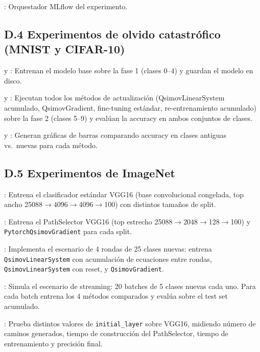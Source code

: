 : Orquestador MLflow del experimento.

\subsection{D.4 Experimentos de olvido catastrófico (MNIST y CIFAR-10)}

 y
: Entrenan el
modelo base sobre la fase 1 (clases 0--4) y guardan el modelo en disco.

 y
: Ejecutan todos
los métodos de actualización (QsimovLinearSystem acumulado, QsimovGradient, fine-tuning estándar,
re-entrenamiento acumulado) sobre la fase 2 (clases 5--9) y evalúan la accuracy en ambos conjuntos
de clases.

{\relax
{} y
:
Generan gráficas de barras comparando accuracy en clases antiguas vs.\ nuevas para cada método.
\par}

\subsection{D.5 Experimentos de ImageNet}

: Entrena el
clasificador estándar VGG16 (base convolucional congelada, top ancho 25088$\rightarrow$4096$\rightarrow$4096$\rightarrow$100)
con distintos tamaños de split.

: Entrena el
PathSelector VGG16 (top estrecho 25088$\rightarrow$2048$\rightarrow$128$\rightarrow$100) y
\texttt{PytorchQsimovGradient} para cada split.

: Implementa
el escenario de 4 rondas de 25 clases nuevas: entrena \texttt{QsimovLinearSystem} con acumulación
de ecuaciones entre rondas, \texttt{QsimovLinearSystem} con reset, y \texttt{QsimovGradient}.

:
Simula el escenario de streaming: 20 batches de 5 clases nuevas cada uno. Para cada batch entrena
los 4 métodos comparados y evalúa sobre el test set acumulado.

: Prueba distintos
valores de \texttt{initial\_layer} sobre VGG16, midiendo número de caminos generados, tiempo de
construcción del PathSelector, tiempo de entrenamiento y precisión final.
